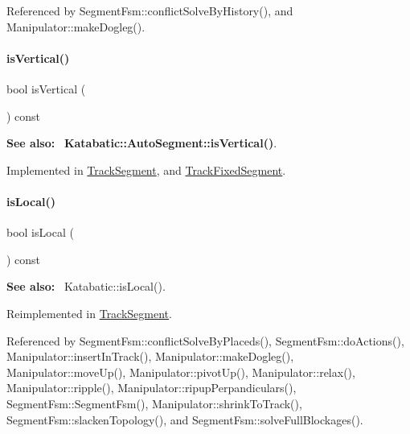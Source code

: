 Referenced by Segment\+Fsm\+::conflict\+Solve\+By\+History(), and Manipulator\+::make\+Dogleg().

\mbox{\label{classKite_1_1TrackElement_a6fa2bf0568a2b295dd7cd1f7207247d5}} 
\paragraph{\texorpdfstring{is\+Vertical()}{isVertical()}}
{\footnotesize\ttfamily bool is\+Vertical (\begin{DoxyParamCaption}{ }\end{DoxyParamCaption}) const\hspace{0.3cm}{\ttfamily [pure virtual]}}

{\bfseries See also\+:}~ \textbf{ Katabatic\+::\+Auto\+Segment\+::is\+Vertical()}. 

Implemented in \hyperlink{classKite_1_1TrackSegment_abd54544ef1710ee4b67cfb021d73446c}{Track\+Segment}, and \hyperlink{classKite_1_1TrackFixedSegment_abd54544ef1710ee4b67cfb021d73446c}{Track\+Fixed\+Segment}.

\mbox{\label{classKite_1_1TrackElement_add556a145a89fdbcea82346abfb873dc}} 
\paragraph{\texorpdfstring{is\+Local()}{isLocal()}}
{\footnotesize\ttfamily bool is\+Local (\begin{DoxyParamCaption}{ }\end{DoxyParamCaption}) const\hspace{0.3cm}{\ttfamily [virtual]}}

{\bfseries See also\+:}~ Katabatic\+::is\+Local(). 

Reimplemented in \hyperlink{classKite_1_1TrackSegment_add556a145a89fdbcea82346abfb873dc}{Track\+Segment}.



Referenced by Segment\+Fsm\+::conflict\+Solve\+By\+Placeds(), Segment\+Fsm\+::do\+Actions(), Manipulator\+::insert\+In\+Track(), Manipulator\+::make\+Dogleg(), Manipulator\+::move\+Up(), Manipulator\+::pivot\+Up(), Manipulator\+::relax(), Manipulator\+::ripple(), Manipulator\+::ripup\+Perpandiculars(), Segment\+Fsm\+::\+Segment\+Fsm(), Manipulator\+::shrink\+To\+Track(), Segment\+Fsm\+::slacken\+Topology(), and Segment\+Fsm\+::solve\+Full\+Blockages().

